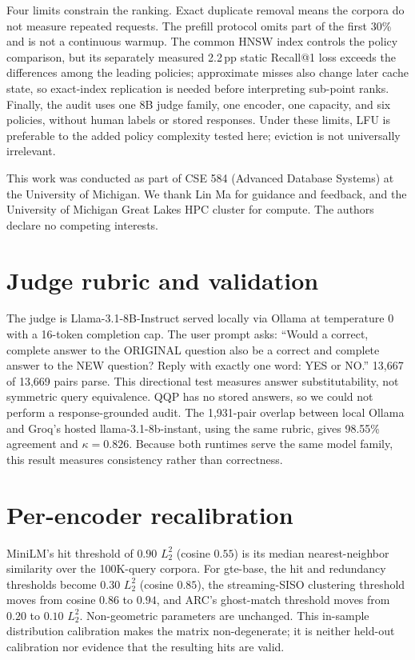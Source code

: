 \documentclass{article}
\begin{document}
Four limits constrain the ranking. Exact duplicate removal means the corpora
do not measure repeated requests. The prefill protocol omits part of the first
30\% and is not a continuous warmup. The common HNSW index controls the policy
comparison, but its separately measured 2.2\,pp static Recall@1 loss exceeds
the differences among the leading policies; approximate misses also change
later cache state, so exact-index replication is needed before interpreting
sub-point ranks. Finally, the audit uses one 8B judge family, one encoder, one
capacity, and six policies, without human labels or stored responses. Under
these limits, LFU is preferable to the added policy complexity tested here;
eviction is not universally irrelevant.

\begin{ack}
This work was conducted as part of CSE 584 (Advanced Database Systems) at the University of Michigan. We thank Lin Ma for guidance and feedback, and the University of Michigan Great Lakes HPC cluster for compute. The authors declare no competing interests.
\end{ack}




\appendix

\section{Judge rubric and validation}
The judge is Llama-3.1-8B-Instruct served locally via Ollama at temperature 0
with a 16-token completion cap. The user prompt asks: ``Would a correct,
complete answer to the ORIGINAL question also be a correct and complete answer
to the NEW question? Reply with exactly one word: YES or NO.'' 13{,}667 of
13{,}669 pairs parse. This directional test measures answer substitutability,
not symmetric query equivalence. QQP has no stored answers, so we could not
perform a response-grounded audit. The 1{,}931-pair overlap between local
Ollama and Groq's hosted llama-3.1-8b-instant, using the same rubric, gives
98.55\% agreement and $\kappa=0.826$. Because both runtimes serve the same
model family, this result measures consistency rather than correctness.

\section{Per-encoder recalibration}
MiniLM's hit threshold of $0.90$ $L_2^2$ (cosine $0.55$) is its median
nearest-neighbor similarity over the 100K-query corpora. For gte-base, the hit
and redundancy thresholds become $0.30$ $L_2^2$ (cosine $0.85$), the
streaming-SISO clustering threshold moves from cosine $0.86$ to $0.94$, and ARC's
ghost-match threshold moves from $0.20$ to $0.10$ $L_2^2$. Non-geometric
parameters are unchanged. This in-sample distribution calibration makes the
matrix non-degenerate; it is neither held-out calibration nor evidence that
the resulting hits are valid.
\end{document}

